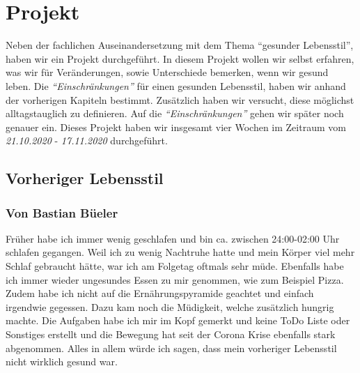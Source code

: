 \chapter{Projekt}
\authortoc{\dario}{\chapterident}
Neben der fachlichen Auseinandersetzung mit dem Thema “gesunder Lebensstil”, haben wir ein Projekt durchgeführt. In diesem Projekt wollen wir selbst erfahren, was wir für Veränderungen, sowie Unterschiede bemerken, wenn wir gesund leben. Die \textit{“Einschränkungen”} für einen gesunden Lebensstil, haben wir anhand der vorherigen Kapiteln bestimmt. Zusätzlich haben wir versucht, diese möglichst alltagstauglich zu definieren. Auf die \textit{“Einschränkungen”} gehen wir später noch genauer ein. Dieses Projekt haben wir insgesamt vier Wochen im Zeitraum vom \textit{21.10.2020} - \textit{17.11.2020} durchgeführt.
\section{Vorheriger Lebensstil}
\subsection{Von Bastian Büeler}
\authortoc{\bastian}{\subsectionident}
Früher habe ich immer wenig geschlafen und bin ca. zwischen 24:00-02:00 Uhr schlafen gegangen. Weil ich zu wenig Nachtruhe hatte und mein Körper viel mehr Schlaf gebraucht hätte, war ich am Folgetag oftmals sehr müde. Ebenfalls habe ich immer wieder ungesundes Essen zu mir genommen, wie zum Beispiel Pizza. Zudem habe ich nicht auf die Ernährungspyramide geachtet und einfach irgendwie gegessen. Dazu kam noch die Müdigkeit, welche zusätzlich hungrig machte. Die Aufgaben habe ich mir im Kopf gemerkt und keine ToDo Liste oder Sonstiges erstellt und die Bewegung hat seit der Corona Krise ebenfalls stark abgenommen. Alles in allem würde ich sagen, dass mein vorheriger Lebensstil nicht wirklich gesund war.
